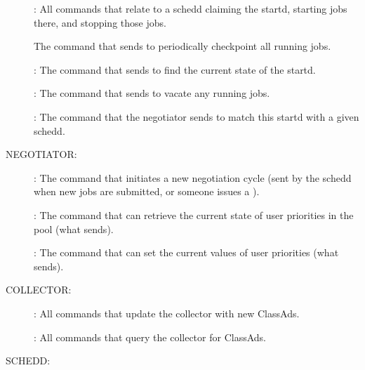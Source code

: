 \begin{description}
\item[] : All commands that relate to a schedd claiming
  the startd, starting jobs there, and stopping those jobs.

  The command that  sends to periodically checkpoint
  all running jobs.

\item[] : The command that  sends to find the
  current state of the startd.

\item[] : The command that  sends to vacate
  any running jobs.

\item[] : The command that the negotiator sends to
  match this startd with a given schedd.
\end{description}

NEGOTIATOR:

\begin{description}
\item[] : The command that initiates a new negotiation
  cycle (sent by the schedd when new jobs are submitted, or someone
  issues a ).

\item[] : The command that can retrieve the current state
  of user priorities in the pool (what  sends).

\item[] : The command that can set the current
  values of user priorities (what  sends).
\end{description}

COLLECTOR:

\begin{description}
\item[] : All commands that update the collector with
new ClassAds.

\item[] : All commands that query the collector for
ClassAds.
\end{description}

SCHEDD: 


